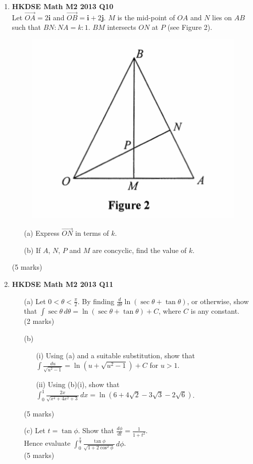 \documentclass[12pt]{article}
\begin{document}
\begin{enumerate}
	\item \textbf{HKDSE Math M2 2013 Q10}\\
	Let $\overrightarrow{OA} = 2\textbf{i}$ and 
	$\overrightarrow{OB} = \textbf{i} +2 \textbf{j}$. $M$ is the mid-point of $OA$ and $N$ lies on $AB$ such that $BN : NA = k: 1$. $BM$ intersects $ON$ at $P$ (see Figure 2).
	\begin{figure}[H]
		\centering
		\includegraphics[width = .5\linewidth]{2013Figure2}
	\end{figure}
	\begin{enumerate}
		\item [(a)]Express $\overrightarrow{ON}$ in terms of $k$.
		\item [(b)]If $A$, $N$, $P$ and $M$ are concyclic, find the value of $k$.
	\end{enumerate}
	(5 marks)

	\item \textbf{HKDSE Math M2 2013 Q11}
	\begin{enumerate}
		\item [(a)]Let $0 < \theta < \displaystyle\frac{\pi}{2}$. By finding $\displaystyle\frac{d}{d\theta} \ln{(\sec{\theta} + \tan{\theta})}$, or otherwise, show that $\displaystyle\int\sec{\theta}\,d\theta =\ln{(\sec{\theta} + \tan{\theta})} + C$, where $C$ is any constant. \\(2 marks)
		\item [(b)]
		\begin{enumerate}
			\item [(i)]Using (a) and a suitable substitution, show that $\displaystyle\int\frac{du}{\sqrt{u^2-1}} = \ln{(u + \sqrt{u^2-1})} + C$ for $u > 1$. 
			\item [(ii)]Using (b)(i), show that $\displaystyle\int_{0}^{1}\frac{2x}{\sqrt{x^4+4x^2+3}}\,dx = \ln{(6 + 4\sqrt{2} - 3\sqrt{3} - 2\sqrt{6})}$.
		\end{enumerate}
		(5 marks)
		\item [(c)]Let $t = \tan{\phi}$. Show that $\displaystyle\frac{d\phi}{dt} = \frac{1}{1+t^2}$. \\
		Hence evaluate $\displaystyle\int_0^{\frac{\pi}{4}}\frac{\tan{\phi}}{\sqrt{1+2\cos^2{\phi}}}\,d\phi$. \\(5 marks)
	\end{enumerate}



\end{enumerate}
\end{document}
